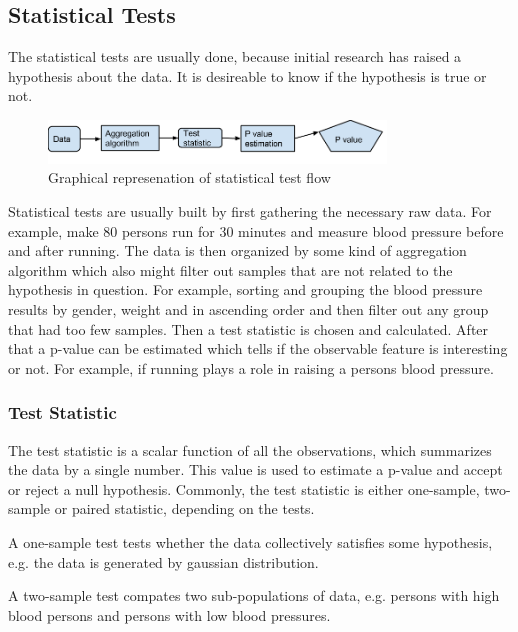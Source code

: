 \documentclass[12pt]{article}
\begin{document}
\subsection{Statistical Tests}

The statistical tests are usually done, because initial research has raised a hypothesis about the data. It is desireable to know if the hypothesis is true or not.

\begin{figure}[!ht]
  \centering
  \includegraphics[width=0.8\textwidth]{statisticalTestFlow}
  \caption{Graphical represenation of statistical test flow}
  \label{fig:statisticalTestFlow}
\end{figure}

Statistical tests are usually built by first gathering the necessary raw data. For example, make 80 persons run for 30 minutes and measure blood pressure before and after running. The data is then organized by some kind of aggregation algorithm which also might filter out samples that are not related to the hypothesis in question. For example, sorting and grouping the blood pressure results by gender, weight and in ascending order and then filter out any group that had too few samples. Then a test statistic is chosen and calculated. After that a p-value can be estimated which tells if the observable feature is interesting or not. For example, if running plays a role in raising a persons blood pressure.

\subsubsection{Test Statistic}

The test statistic is a scalar function of all the observations, which summarizes the data by a single number. This value is used to estimate a p-value and accept or reject a null hypothesis. Commonly, the test statistic is either one-sample, two-sample or paired statistic, depending on the tests.

A one-sample test tests whether the data collectively satisfies some hypothesis, e.g. the data is generated by gaussian distribution.

A two-sample test compates two sub-populations of data, e.g. persons with high blood persons and persons with low blood pressures.
\end{document}
